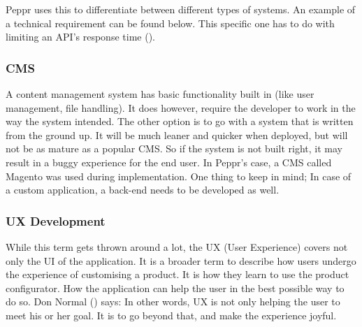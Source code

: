 \newline

Peppr uses this to differentiate between different types of systems. An example of a technical requirement can be found below. This specific one has to do with limiting an API's response time (\cite{responseTimes}).

\newline

\subsubsection{CMS}
A content management system has basic functionality built in (like user management, file handling). It does however, require  the developer to work in the way the system intended. The other option is to go with a system that is written from the ground up. It will be much leaner and quicker when deployed, but will not be as mature as a popular CMS. So if the system is not built right, it may result in a buggy experience for the end user. In Peppr's case, a CMS called Magento was used during implementation. One thing to keep in mind; In case of a custom application, a back-end needs to be developed as well.
\subsubsection{UX Development}
While this term gets thrown around a lot, the UX (User Experience) covers not only the UI of the application. It is a broader term to describe how users undergo the experience of customising a product. It is how they learn to use the product configurator. How the application can help the user in the best possible way to do so. Don Normal (\cite{userExperience}) says: \newline
{} \newline
In other words, UX is not only helping the user to meet his or her goal. It is to go beyond that, and make the experience joyful.

